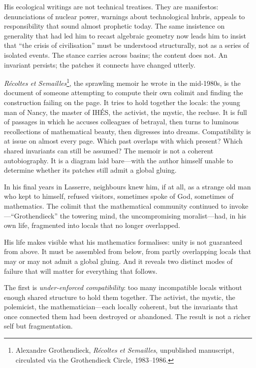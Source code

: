 His ecological writings are not technical treatises. They are manifestos: denunciations of nuclear power, warnings about technological hubris, appeals to responsibility that sound almost prophetic today. The same insistence on generality that had led him to recast algebraic geometry now leads him to insist that ``the crisis of civilisation'' must be understood structurally, not as a series of isolated events. The stance carries across basins; the content does not. An invariant persists; the patches it connects have changed utterly.

\emph{R\'{e}coltes et Semailles}\footnote{Alexandre Grothendieck, \emph{R\'{e}coltes et Semailles}, unpublished manuscript, circulated via the Grothendieck Circle, 1983--1986.}, the sprawling memoir he wrote in the mid-1980s, is the document of someone attempting to compute their own colimit and finding the construction failing on the page. It tries to hold together the locals: the young man of Nancy, the master of IH\'{E}S, the activist, the mystic, the recluse. It is full of passages in which he accuses colleagues of betrayal, then turns to luminous recollections of mathematical beauty, then digresses into dreams. Compatibility is at issue on almost every page. Which past overlaps with which present? Which shared invariants can still be assumed? The memoir is not a coherent autobiography. It is a diagram laid bare---with the author himself unable to determine whether its patches still admit a global gluing.

In his final years in Lasserre, neighbours knew him, if at all, as a strange old man who kept to himself, refused visitors, sometimes spoke of God, sometimes of mathematics. The colimit that the mathematical community continued to invoke---``Grothendieck'' the towering mind, the uncompromising moralist---had, in his own life, fragmented into locals that no longer overlapped.

His life makes visible what his mathematics formalises: unity is not guaranteed from above. It must be assembled from below, from partly overlapping locals that may or may not admit a global gluing. And it reveals two distinct modes of failure that will matter for everything that follows.

The first is \emph{under-enforced compatibility}: too many incompatible locals without enough shared structure to hold them together. The activist, the mystic, the polemicist, the mathematician---each locally coherent, but the invariants that once connected them had been destroyed or abandoned. The result is not a richer self but fragmentation.

